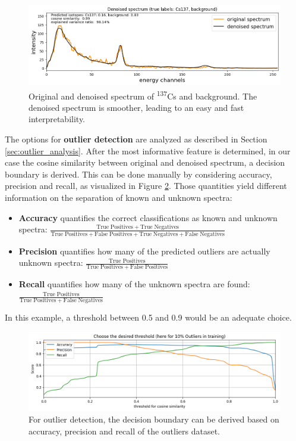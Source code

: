 \documentclass[preprint,12pt, a4paper]{elsarticle}
\begin{document}
\begin{figure}
\includegraphics[width=\textwidth]{Denoised_Cs137.png}
\caption{Original and denoised spectrum of \textsuperscript{137}Cs and background. The denoised spectrum is smoother, leading to an easy and fast interpretability.}
\label{fig:denoised_spectrum}
\end{figure}

The options for \textbf{outlier detection} are analyzed as described in Section \ref{sec:outlier_analysis}. After the most informative feature is determined, in our case the cosine similarity between original and denoised spectrum, a decision boundary is derived. This can be done manually by considering accuracy, precision and recall, as visualized in Figure \ref{fig:outlier}. Those quantities yield different information on the separation of known and unknown spectra:
\begin{itemize}
\item \textbf{Accuracy} quantifies the correct classifications as known and unknown spectra: $\frac{\mathrm{True\;Positives + True\;Negatives}}{\mathrm{True\;Positives + False\;Positives + True\;Negatives + False\;Negatives}}$
\item \textbf{Precision} quantifies how many of the predicted outliers are actually unknown spectra: $\frac{\mathrm{True\;Positives}}{\mathrm{True\;Positives + False\;Positives}}$
\item \textbf{Recall} quantifies how many of the unknown spectra are found: \\$\frac{\mathrm{True\;Positives}}{\mathrm{True\;Positives + False\;Negatives}}$
\end{itemize}
In this example, a threshold between 0.5 and 0.9 would be an adequate choice. 

\begin{figure}
\includegraphics[width=\textwidth]{outlier_accuracy_precision_recall.png}
\caption{For outlier detection, the decision boundary can be derived based on accuracy, precision and recall of the outliers dataset. }
\label{fig:outlier}
\end{figure}
\end{document}
